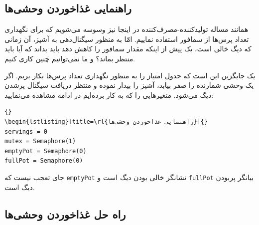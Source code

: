 \documentclass{book}
\newcommand{\clearemptydoublepage}{\newpage\cleardoublepage}
\begin{document}
\subsection{راهنمایی غذاخوردن وحشی‌ها}

    همانند مساله تولیدکننده-مصرف‌کننده  در اینجا نیز وسوسه می‌شویم که برای نگهداری تعداد پرس‌ها از سمافور استفاده نماییم. 
    امّا به منظور سیگنال‌دهی به آشپز،‌ آن زمانی که دیگ خالی است، یک پیش از اینکه مقدار سمافور را کاهش دهد باید بداند که آیا باید منتظر بماند؟ و 
    ما نمی‌توانیم چنین کاری کنیم. 

    یک جایگزین این است که جدول امتیاز را به منظور نگهداری تعداد پرس‌ها بکار بریم. 
    اگر یک وحشی شمارنده را صفر بیابد، آشپز را بیدار نموده و منتظر دریافت سیگنال پرشدن دیگ می‌شود. 
    متغیرهایی را که به کار برده‌ایم در ادامه مشاهده می‌نمایید:

\begin{latin}
\begin{latin}
\begin{lstlisting}[title={Dining Savages hint}]{}
\begin{lstlisting}[title=\rl{راهنمایی غذاخوردن وحشی‌ها}]{}
servings = 0
mutex = Semaphore(1)
emptyPot = Semaphore(0)
fullPot = Semaphore(0)
\end{lstlisting}
\end{latin}
\end{latin}

    جای تعجب نیست که {\tt emptyPot} نشانگر خالی بودن دیگ است و {\tt fullPot} بیانگر پربودن دیگ است. 

\clearemptydoublepage
\subsection{راه‌ حل غذاخوردن وحشی‌ها}
\end{document}
